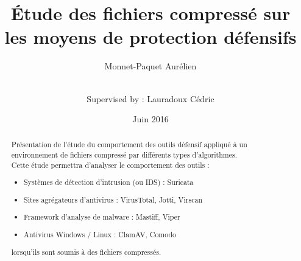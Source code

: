 \documentclass[smallextended]{svjour3}       %
\begin{document}
\title{Étude des fichiers compressé sur les moyens de protection défensifs}


\author{Monnet-Paquet Aurélien  \\ \and \\
        Supervised by : Lauradoux Cédric
}



\date{Juin 2016}


\maketitle

\begin{abstract}
$ $\\Présentation de l'étude du comportement des outils défensif appliqué à un environnement de fichiers compressé par différents types d'algorithmes.\\
Cette étude permettra d'analyser le comportement des outils :
\begin{itemize}
\item Systèmes de détection d'intrusion (ou IDS) : Suricata
\item Sites agrégateurs d'antivirus : VirusTotal, Jotti, Virscan
\item Framework d'analyse de malware : Mastiff, Viper
\item Antivirus Windows / Linux : ClamAV, Comodo
\end{itemize}
lorsqu'ils sont soumis à des fichiers compressés.

\end{abstract}
\end{document}
